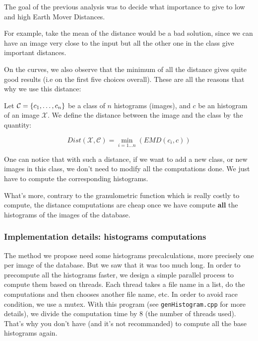 The goal of the previous analysis was to decide what importance to give to low and high Earth Mover Distances.

For example, take the mean of the distance would be a bad solution, since we can have an image very close to the input but all the other one in the class give important distances.

On the curves, we also observe that the minimum of all the distance gives quite good results (i.e on the first five choices overall). These are all the reasons that why we use this distance:

\begin{definition}
	Let $\mathcal{C} = \left\{ c_1,\dots,c_n \right\}$ be a class of $n$ histograms (images), and $c$ be an histogram of an image $\mathcal{X}$. We define the distance between the image and the class by the quantity:

\[
	Dist(\mathcal{X},\mathcal{C}) = \underset{i = 1 \dots n}{\operatorname{min}} \left( EMD(c_i,c) \right)
\]

\end{definition}

One can notice that with such a distance, if we want to add a new class, or new images in this class, we don't need to modify all the computations done. We just have to compute the corresponding histograms.

What's more, contrary to the granulometric function which is really costly to compute, the distance computations are cheap once we have compute \textbf{all} the histograms of the images of the database.

\subsubsection{Implementation details: histograms computations}

The method we propose need some histograms precalculations, more precisely one per image of the database. But we saw that it was too much long. In order to precompute all the histograms faster, we design a simple parallel process to compute them based on threads. Each thread takes a file name in a list, do the computations and then chooses another file name, etc. In order to avoid race condition, we use a mutex. With this program (see \texttt{genHistogram.cpp} for more details), we divide the computation time by 8 (the number of threads used). That's why you don't have (and it's not recommanded) to compute all the base histograms again.

